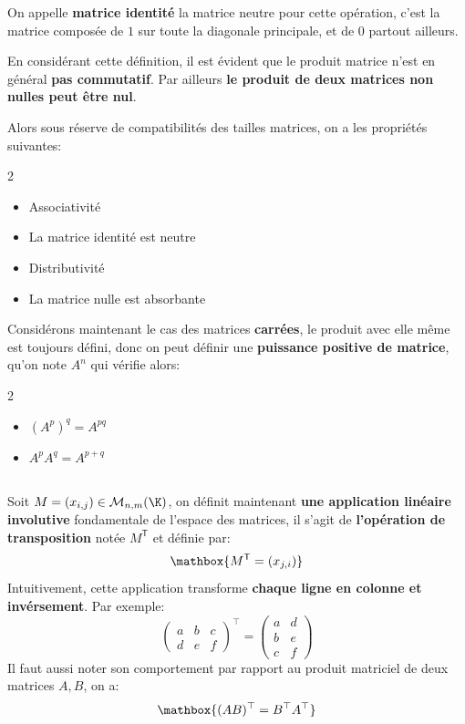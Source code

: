 On appelle \textbf{matrice identité} la matrice neutre pour cette opération, c'est la matrice composée de \(1\) sur toute la diagonale principale, et de \(0\) partout ailleurs.\<

En considérant cette définition, il est évident que le produit matrice n'est en général \textbf{pas commutatif}. Par ailleurs \textbf{le produit de deux matrices non nulles peut être nul}.
\pagebreak

Alors sous réserve de compatibilités des tailles matrices, on a les propriétés suivantes:
\begin{multicols}{2}
   \begin{itemize}
      \item Associativité
      \item La matrice identité est neutre
      \item Distributivité
      \item La matrice nulle est absorbante
   \end{itemize}
\end{multicols}   

Considérons maintenant le cas des matrices \textbf{carrées}, le produit avec elle même est toujours défini, donc on peut définir une \textbf{puissance positive de matrice}, qu'on note \(A^n\) qui vérifie alors:

\begin{multicols}{2}
   \begin{itemize}
      \item \((A^p)^q = A^{pq}\)
      \item \(A^pA^q = A^{p +q}\)
   \end{itemize}
\end{multicols}    

\subsection*{}
Soit \(M = (x_{i,j})\in \mathcal{M}_{n, m}(\K)\), on définit maintenant \textbf{une application linéaire involutive} fondamentale de l'espace des matrices, il s'agit de \textbf{l'opération de transposition} notée \(M^\mathsf{T}\) et définie par:
\[
   \mathbox{M^\mathsf{T} = (x_{j,i})}   
\]
Intuitivement, cette application transforme \textbf{chaque ligne en colonne et invérsement}. Par exemple:
\[
   \begin{pmatrix}
      a & b & c\\
      d & e & f
   \end{pmatrix}^\top = 
   \begin{pmatrix}
      a & d\\
      b & e\\
      c & f
   \end{pmatrix}
\]
Il faut aussi noter son comportement par rapport au produit matriciel de deux matrices \(A, B\), on a:
\[
   \mathbox{
      (AB)^\top = B^\top A^\top
   }
\]


